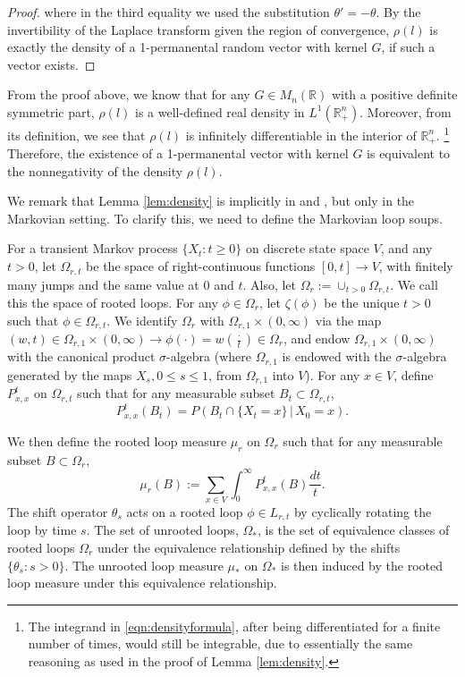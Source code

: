\documentclass[a4paper, 11pt]{article}
\begin{document}
\begin{proof}
where in the third equality we used the substitution $\theta'=-\theta$. By
the invertibility of the Laplace transform given the region of convergence, $\rho(l)$ is exactly the density of a 1-permanental random vector with kernel $G$, if such a vector exists.
\end{proof}

From the proof above, we know that for any $G \in M_n(\mathbb{R})$ with a positive definite symmetric part,
$\rho(l)$ is a well-defined real density in $L^1(\mathbb{R}_+^n)$. Moreover, from its definition, we see that $\rho(l)$ is infinitely differentiable in the interior of $\mathbb{R}_+^n$.
\footnote{The integrand in \cref{eqn:densityformula}, after being differentiated for a finite number of times, would still be integrable, due to essentially the same reasoning as used in the proof of Lemma \ref{lem:density}.}
Therefore, the existence of a 1-permanental vector with kernel $G$ is equivalent to the nonnegativity
of the density $\rho(l)$.

We remark that Lemma \ref{lem:density} is
implicitly in
\cite{av20} and \cite{fr14}, but only in the Markovian setting.
To clarify this, we need to define the Markovian loop soups.

For a transient Markov process $\{X_t: t\geq 0\}$ on discrete state space $V$, and any $t>0$, let $\Omega_{r,t}$ be the space of right-continuous functions $[0, t] \rightarrow V$, with finitely many jumps and the same value at $0$ and $t$. Also, let $\Omega_r :=\cup_{t>0}\Omega_{r,t}$. We call this the space of rooted loops. For any $\phi\in \Omega_r$, let $\zeta(\phi)$ be the unique $t>0$ such that $\phi\in \Omega_{r,t}$.  We identify $\Omega_r$ with $\Omega_{r,1}\times (0,\infty)$ via the map $(w, t)\in \Omega_{r,1}\times (0, \infty) \rightarrow \phi(\cdot) = w(\frac{\cdot}{t})\in \Omega_r$, and endow $\Omega_{r,1}\times (0, \infty)$ with the canonical product $\sigma$-algebra (where $\Omega_{r,1}$ is endowed with the $\sigma$-algebra generated by the maps $X_s, 0 \leq s \leq 1$, from $\Omega_{r,1}$ into $V$). For any $x\in V$, define $P_{x,x}^t$ on $\Omega_{r,t}$ such that for any measurable subset $B_t\subset\Omega_{r,t}$,
\[P_{x,x}^t(B_t) = P(B_t\cap \{X_t = x\}\,|\,X_0=x).\]

We then define the rooted loop measure $\mu_r$ on $\Omega_r$ such that for any measurable subset $B\subset \Omega_r$,
\[\mu_r(B):=\sum_{x\in V}\int_0^\infty P_{x,x}^t(B)\frac{dt}{t}.\]
The shift operator $\theta_s$ acts on a rooted loop $\phi\in L_{r,t}$ by cyclically rotating the loop by time $s$. The set of unrooted loops, $\Omega_*$, is the
set of equivalence classes of rooted loops $\Omega_r$ under the equivalence relationship defined by the shifts $\{\theta_s: s>0\}$. The unrooted loop measure $\mu_*$ on $\Omega_*$ is then induced by the rooted loop measure under this equivalence relationship.
\end{document}
